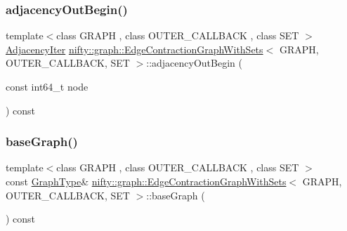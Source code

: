\mbox{\label{classnifty_1_1graph_1_1EdgeContractionGraphWithSets_af9d9cd7de8303720e60f85ae4370d9ac}} 
\subsubsection{\texorpdfstring{adjacency\+Out\+Begin()}{adjacencyOutBegin()}}
{\footnotesize\ttfamily template$<$class G\+R\+A\+PH , class O\+U\+T\+E\+R\+\_\+\+C\+A\+L\+L\+B\+A\+CK , class S\+ET $>$ \\
\hyperlink{classnifty_1_1graph_1_1EdgeContractionGraphWithSets_ab4782e97223ab8ba2d207325aae693d6}{Adjacency\+Iter} \hyperlink{classnifty_1_1graph_1_1EdgeContractionGraphWithSets}{nifty\+::graph\+::\+Edge\+Contraction\+Graph\+With\+Sets}$<$ G\+R\+A\+PH, O\+U\+T\+E\+R\+\_\+\+C\+A\+L\+L\+B\+A\+CK, S\+ET $>$\+::adjacency\+Out\+Begin (\begin{DoxyParamCaption}\item[{const int64\+\_\+t}]{node }\end{DoxyParamCaption}) const\hspace{0.3cm}{\ttfamily [inline]}}

\mbox{\label{classnifty_1_1graph_1_1EdgeContractionGraphWithSets_a1d8c4aa00f646e178a31a38153a9c374}} 
\subsubsection{\texorpdfstring{base\+Graph()}{baseGraph()}}
{\footnotesize\ttfamily template$<$class G\+R\+A\+PH , class O\+U\+T\+E\+R\+\_\+\+C\+A\+L\+L\+B\+A\+CK , class S\+ET $>$ \\
const \hyperlink{classnifty_1_1graph_1_1EdgeContractionGraphWithSets_abadbbebcd10e37a1a3f59bb967accdf0}{Graph\+Type}\& \hyperlink{classnifty_1_1graph_1_1EdgeContractionGraphWithSets}{nifty\+::graph\+::\+Edge\+Contraction\+Graph\+With\+Sets}$<$ G\+R\+A\+PH, O\+U\+T\+E\+R\+\_\+\+C\+A\+L\+L\+B\+A\+CK, S\+ET $>$\+::base\+Graph (\begin{DoxyParamCaption}{ }\end{DoxyParamCaption}) const\hspace{0.3cm}{\ttfamily [inline]}}

